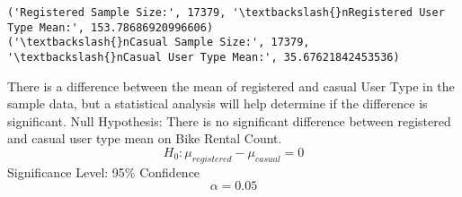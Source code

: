 \documentclass[11pt]{article}
\begin{document}
    \begin{Verbatim}[commandchars=\\\{\}]
('Registered Sample Size:', 17379, '\textbackslash{}nRegistered User Type Mean:', 153.78686920996606)
('\textbackslash{}nCasual Sample Size:', 17379, '\textbackslash{}nCasual User Type Mean:', 35.67621842453536)

    \end{Verbatim}

    There is a difference between the mean of registered and casual User
Type in the sample data, but a statistical analysis will help determine
if the difference is significant. Null Hypothesis: There is no
significant difference between registered and casual user type mean on
Bike Rental Count. \[H_0: \mu_{registered} - \mu_{casual} = 0\]
Significance Level: 95\% Confidence \[\alpha = 0.05\]
\end{document}

